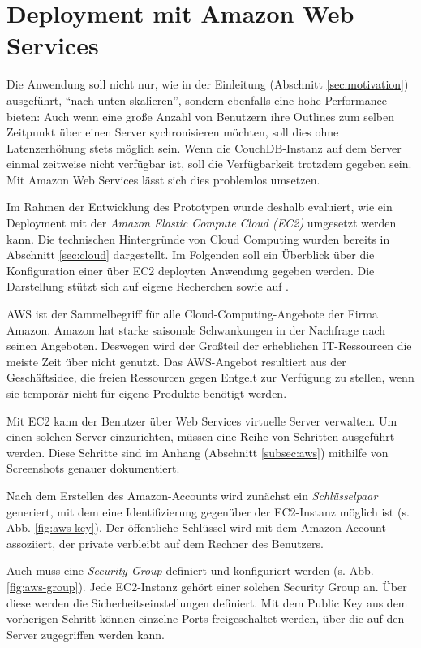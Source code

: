 \section{Deployment mit Amazon Web Services}

Die Anwendung soll nicht nur, wie in der Einleitung (Abschnitt \ref{sec:motivation}) ausgeführt, \enquote{nach unten skalieren}, sondern ebenfalls eine hohe Performance bieten: Auch wenn eine große Anzahl von Benutzern ihre Outlines zum selben Zeitpunkt über einen Server sychronisieren möchten, soll dies ohne Latenzerhöhung stets möglich sein. Wenn die CouchDB-Instanz auf dem Server einmal zeitweise nicht verfügbar ist, soll die Verfügbarkeit trotzdem gegeben sein. Mit Amazon Web Services lässt sich dies problemlos umsetzen.

Im Rahmen der Entwicklung des Prototypen wurde deshalb evaluiert, wie ein Deployment mit der \textit{Amazon Elastic Compute Cloud (EC2)} umgesetzt werden kann. Die technischen Hintergründe von Cloud Computing wurden bereits in Abschnitt \ref{sec:cloud} dargestellt. Im Folgenden soll ein Überblick über die Konfiguration einer über EC2 deployten Anwendung gegeben werden. Die Darstellung stützt sich auf eigene Recherchen sowie auf .

AWS ist der Sammelbegriff für alle Cloud-Computing-Angebote der Firma Amazon. Amazon hat starke saisonale Schwankungen in der Nachfrage nach seinen Angeboten. Deswegen wird der Großteil der erheblichen IT-Ressourcen die meiste Zeit über nicht genutzt. Das AWS-Angebot resultiert aus der Geschäftsidee, die freien Ressourcen gegen Entgelt zur Verfügung zu stellen, wenn sie temporär nicht für eigene Produkte benötigt werden.

Mit EC2 kann der Benutzer über Web Services virtuelle Server verwalten. Um einen solchen Server einzurichten, müssen eine Reihe von Schritten ausgeführt werden. Diese Schritte sind im Anhang (Abschnitt \ref{subsec:aws}) mithilfe von Screenshots genauer dokumentiert.

Nach dem Erstellen des Amazon-Accounts wird zunächst ein \textit{Schlüsselpaar} generiert, mit dem eine Identifizierung gegenüber der EC2-Instanz möglich ist (s. Abb. \ref{fig:aws-key}). Der öffentliche Schlüssel wird mit dem Amazon-Account assoziiert, der private verbleibt auf dem Rechner des Benutzers.

Auch muss eine \textit{Security Group} definiert und konfiguriert werden (s. Abb. \ref{fig:aws-group}). Jede EC2-Instanz gehört einer solchen Security Group an. Über diese werden die Sicherheitseinstellungen definiert. Mit dem Public Key aus dem vorherigen Schritt können einzelne Ports freigeschaltet werden, über die auf den Server zugegriffen werden kann. 

